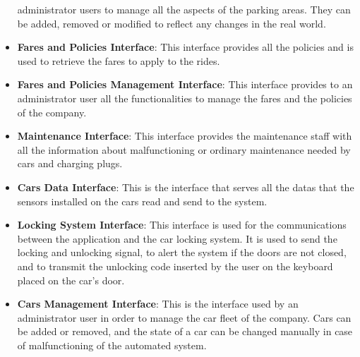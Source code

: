 \begin{itemize}
                                             administrator users to manage all
                                             the aspects of the parking areas.
                                             They can be added, removed or
                                             modified to reflect any changes in
                                             the real world.
  \item \textbf{Fares and Policies Interface}: This interface provides all the
                                               policies and is used to retrieve
                                               the fares to apply to the rides.
  \item \textbf{Fares and Policies Management Interface}: This interface
                                       provides to an administrator user all the
                                       functionalities to manage the fares and
                                       the policies of the company.
  \item \textbf{Maintenance Interface}: This interface provides the maintenance
                                        staff with all the information about
                                        malfunctioning or ordinary maintenance
                                        needed by cars and charging plugs.
  \item \textbf{Cars Data Interface}: This is the interface that serves all the
                                      datas that the sensors installed on the
                                      cars read and send to the system.
  \item \textbf{Locking System Interface}: This interface is used for the
                                           communications between the
                                           application and the car locking
                                           system. It is used to send the
                                           locking and unlocking signal, to
                                           alert the system if the doors are not
                                           closed, and to transmit the unlocking
                                           code inserted by the user on the
                                           keyboard placed on the car's door.
  \item \textbf{Cars Management Interface}: This is the interface used by an
                                            administrator user in order to
                                            manage the car fleet of the company.
                                            Cars can be added or removed, and
                                            the state of a car can be changed
                                            manually in case of malfunctioning
                                            of the automated system.


\end{itemize}
